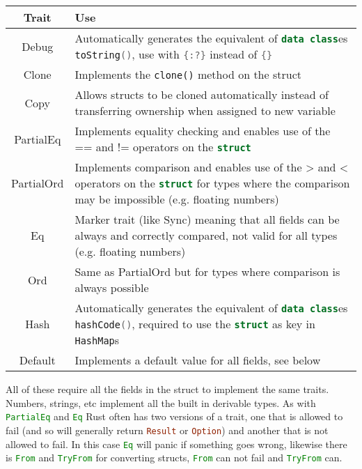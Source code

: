 \documentclass[a4paper,11pt]{article}
\begin{document}
\begin{center}
\begin{tabular}{ |c|p{12cm}| } 
 \hline
 Trait & Use \\ 
 \hline
 Debug & Automatically generates the equivalent of \lstinline[language=Kotlin]|data class|es \lstinline[language=Kotlin]|toString()|, use with \lstinline[language=Rust]|{:?}| instead of \lstinline[language=Rust]|{}| \\
 Clone & Implements the \lstinline[language=Rust]|clone()| method on the struct \\
 Copy & Allows structs to be cloned automatically instead of transferring ownership when assigned to new variable \\
 PartialEq & Implements equality checking and enables use of the == and != operators on the \lstinline[language=Rust]|struct| \\
 PartialOrd & Implements comparison and enables use of the > and < operators on the \lstinline[language=Rust]|struct| for types where the comparison may be impossible (e.g. floating numbers)\\
 Eq & Marker trait (like Sync) meaning that all fields can be always and correctly compared, not valid for all types (e.g. floating numbers) \\
 Ord & Same as PartialOrd but for types where comparison is always possible\\
 Hash & Automatically generates the equivalent of \lstinline[language=Kotlin]|data class|es \lstinline[language=Kotlin]|hashCode()|, required to use the \lstinline[language=Rust]|struct| as key in \lstinline[language=Rust]|HashMap|s \\
 Default & Implements a default value for all fields, see below \\
 \hline
\end{tabular}
\end{center}

All of these require all the fields in the struct to implement the same traits. Numbers, strings, etc implement all the built in derivable types. As with \lstinline[language=Rust]{PartialEq} and \lstinline[language=Rust]{Eq} Rust often has two versions of a trait, one that is allowed to fail (and so will generally return \lstinline[language=Rust]{Result} or \lstinline[language=Rust]{Option}) and another that is not allowed to fail. In this case \lstinline[language=Rust]{Eq} will panic if something goes wrong, likewise there is \lstinline[language=Rust]{From} and \lstinline[language=Rust]{TryFrom} for converting structs, \lstinline[language=Rust]{From} can not fail and \lstinline[language=Rust]{TryFrom} can.
\end{document}
